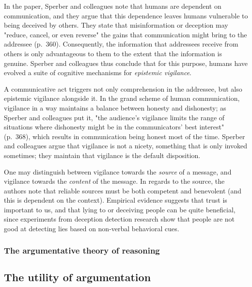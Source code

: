 In the paper, Sperber and colleagues note that humans are dependent on communication, and they argue that this dependence leaves humans vulnerable to being deceived by others.
They state that misinformation or deception may "reduce, cancel, or even reverse" the gains that communication might bring to the addressee (p.~360).
Consequently, the information that addressees receive from others is only advantageous to them to the extent that the information is genuine.
Sperber and colleagues thus conclude that for this purpose, humans have evolved a suite of cognitive mechanisms for \emph{epistemic vigilance}.

A communicative act triggers not only comprehension in the addressee, but also epistemic vigilance alongside it.
In the grand scheme of human communication, vigilance in a way maintains a balance between honesty and dishonesty; as Sperber and colleagues put it, "the audience's vigilance limits the range of situations where dishonesty might be in the communicators' best interest" (p.~368), which results in communication being honest most of the time.
Sperber and colleagues argue that vigilance is not a nicety, something that is only invoked sometimes; they maintain that vigilance is the default disposition.

One may distinguish between vigilance towards the \emph{source} of a message, and vigilance towards the \emph{content} of the message.
In regards to the source, the authors note that reliable sources must be both competent and benevolent (and this is dependent on the context).
Empirical evidence suggests that trust is important to us, and that lying to or deceiving people can be quite beneficial, since experiments from deception detection research show that people are not good at detecting lies based on non-verbal behavioral cues.

\subsubsection{The argumentative theory of reasoning}

\subsection{The utility of argumentation}
